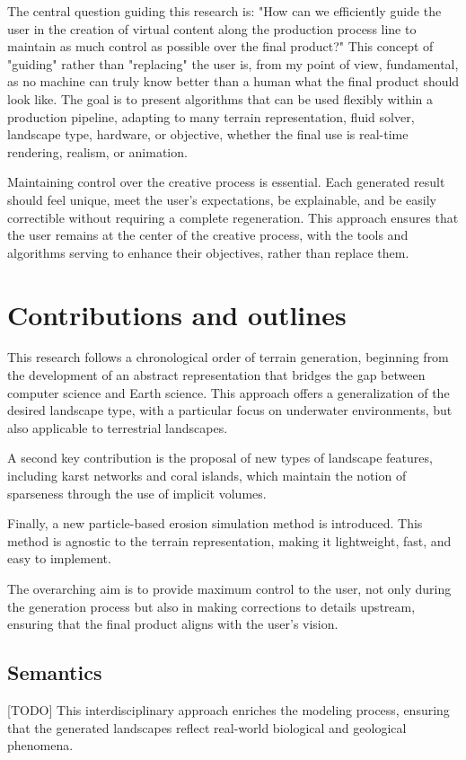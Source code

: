 The central question guiding this research is: "How can we efficiently guide the user in the creation of virtual content along the production process line to maintain as much control as possible over the final product?" This concept of "guiding" rather than "replacing" the user is, from my point of view, fundamental, as no machine can truly know better than a human what the final product should look like. The goal is to present algorithms that can be used flexibly within a production pipeline, adapting to many terrain representation, fluid solver, landscape type, hardware, or objective, whether the final use is real-time rendering, realism, or animation.

Maintaining control over the creative process is essential. Each generated result should feel unique, meet the user's expectations, be explainable, and be easily correctible without requiring a complete regeneration. This approach ensures that the user remains at the center of the creative process, with the tools and algorithms serving to enhance their objectives, rather than replace them.

\section{Contributions and outlines}
This research follows a chronological order of terrain generation, beginning from the development of an abstract representation that bridges the gap between computer science and Earth science. This approach offers a generalization of the desired landscape type, with a particular focus on underwater environments, but also applicable to terrestrial landscapes.

A second key contribution is the proposal of new types of landscape features, including karst networks and coral islands, which maintain the notion of sparseness through the use of implicit volumes. 

Finally, a new particle-based erosion simulation method is introduced. This method is agnostic to the terrain representation, making it lightweight, fast, and easy to implement. 

The overarching aim is to provide maximum control to the user, not only during the generation process but also in making corrections to details upstream, ensuring that the final product aligns with the user's vision.

\subsection{Semantics}
[TODO]
This interdisciplinary approach enriches the modeling process, ensuring that the generated landscapes reflect real-world biological and geological phenomena.

